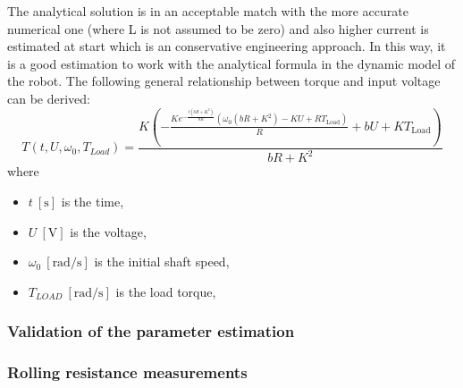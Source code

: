\documentclass[12pt,english]{article}
\begin{document}
The analytical solution is in an acceptable match with the more accurate numerical one (where L is not assumed to be zero) and also higher current is estimated at start which is an conservative engineering approach. In this way, it is a good estimation to work with the analytical formula in the dynamic model of the robot. The following general relationship between torque and input voltage can be derived:
\begin{equation}
	T(t,U,\omega_0,T_{Load}) = \frac{K \left(-\frac{K e^{-\frac{t \left(b R+K^2\right)}{\theta  R}} \left(\omega _0 \left(b R+K^2\right)-K U+R T_{\text{Load}}\right)}{R}+b U+K T_{\text{Load}}\right)}{b R+K^2}
	\label{motor_load_equation}
\end{equation}
where \begin{itemize}
	\item $t~[\text{s}]$ is the time,
	\item $U~[\text{V}]$ is the voltage,
	\item $\omega_0~[\text{rad/s}]$ is the initial shaft speed,
	\item $T_{LOAD}~[\text{rad/s}]$ is the load torque,
\end{itemize}
\subsubsection{Validation of the parameter estimation}
\subsubsection{Rolling resistance measurements}

\newpage
\end{document}
